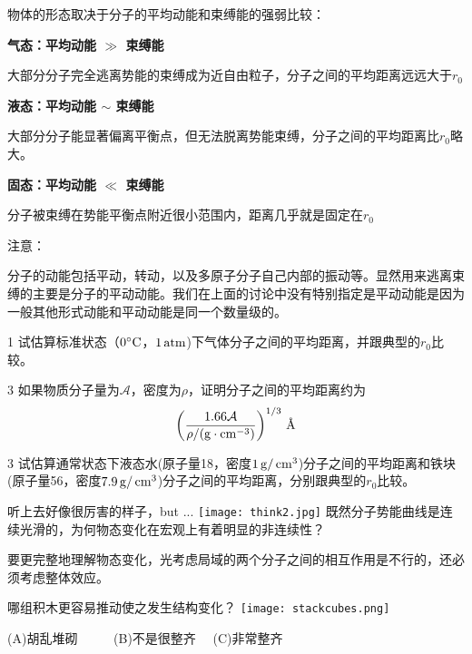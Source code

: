 \documentclass[CJK]{beamer}
\begin{document}
\begin{frame}
\bch
物体的形态取决于分子的平均动能和束缚能的强弱比较：
\bitem
\item{{\bf 气态：平均动能 $\gg$ 束缚能}

{\small 大部分分子完全逃离势能的束缚成为近自由粒子，分子之间的平均距离远远大于$r_0$}
}
\item{{\bf 液态：平均动能 $\sim$ 束缚能}

{\small 大部分分子能显著偏离平衡点，但无法脱离势能束缚，分子之间的平均距离比$r_0$略大。}
}
\item{{\bf 固态：平均动能 $\ll$ 束缚能}

{\small 分子被束缚在势能平衡点附近很小范围内，距离几乎就是固定在$r_0$}
}
\eitem

{\small 注意：
\bitem
\item{分子的动能包括平动，转动，以及多原子分子自己内部的振动等。显然用来逃离束缚的主要是分子的平动动能。我们在上面的讨论中没有特别指定是平动动能是因为一般其他形式动能和平动动能是同一个数量级的。}
\eitem
}
\ech
\end{frame}

\begin{frame}
\bch
\bitem
\item[1]{试估算标准状态（$0^\circ \mathrm{C}$，$1\,\mathrm{atm}$)下气体分子之间的平均距离，并跟典型的$r_0$比较。}
\item[3]{如果物质分子量为$\mathcal{A}$，密度为$\rho$，证明分子之间的平均距离约为
$$\left(\frac{1.66 \mathcal{A} }{\rho / (\mathrm{g}\cdot \mathrm{cm}^{-3})}\right)^{1/3}\,\text{\AA}$$
}
\item[3]{试估算通常状态下液态水(原子量18，密度$1\,\mathrm{g}/\,\mathrm{cm}^3$)分子之间的平均距离和铁块(原子量56，密度$7.9\,\mathrm{g}/\,\mathrm{cm}^3$)分子之间的平均距离，分别跟典型的$r_0$比较。}
\eitem
\ech
\end{frame}


\begin{frame}
\bch
听上去好像很厉害的样子，but ...
\bcenter
\texttt{[image: think2.jpg]}
\ecenter
既然分子势能曲线是连续光滑的，为何物态变化在宏观上有着明显的非连续性？
\ech
\end{frame}

\begin{frame}
\bch
要更完整地理解物态变化，光考虑局域的两个分子之间的相互作用是不行的，还必须考虑整体效应。
\ech
\end{frame}

\begin{frame}
\bch
哪组积木更容易推动使之发生结构变化？
\texttt{[image: stackcubes.png]}

(A)胡乱堆砌 \ \ \ \ \  (B)不是很整齐 \ \ (C)非常整齐

\ech
\end{frame}
\end{document}
